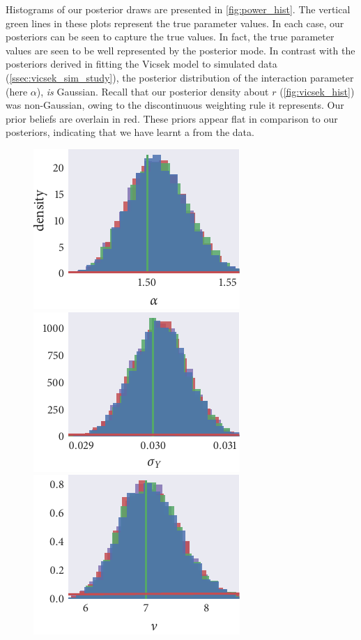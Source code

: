 Histograms of our posterior draws are presented in \cref{fig:power_hist}. The
vertical green lines in these plots represent the true parameter values. In
each case, our posteriors can be seen to capture the true values. In fact, the
true parameter values are seen to be well represented by the posterior mode. In
contrast with the posteriors derived in fitting the Vicsek model to simulated
data (\cref{ssec:vicsek_sim_study}), the posterior distribution of the
interaction parameter (here $\alpha$), \emph{is} Gaussian. Recall that our
posterior density about $r$ (\cref{fig:vicsek_hist}) was non-Gaussian, owing to
the discontinuous weighting rule it represents. Our prior beliefs are overlain
in red. These priors appear flat in comparison to our posteriors, indicating
that we have learnt a from the data.

\begin{figure}[tbp]
  \includegraphics{power_hist_alpha.pdf}%
  \includegraphics{power_hist_sigma_Y.pdf}%
  \includegraphics{power_hist_nu.pdf}

\end{figure}
